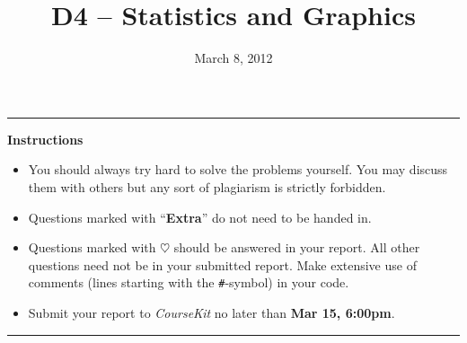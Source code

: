 \documentclass[a4paper]{article}
\title{D4 -- Statistics and Graphics}
\date{March 8, 2012}
\begin{document}
\maketitle
\hrule
\begin{center}
\textbf{Instructions}
\end{center}
\begin{itemize}
\item You should always try hard to solve the problems yourself. You may
  discuss them with others but any sort of plagiarism is strictly forbidden.

\item Questions marked with ``\textbf{Extra}'' do not need to be handed in. 

\item Questions marked with $\heartsuit$ should be answered in your report. All
  other questions need not be in your submitted report. Make extensive use of
  comments (lines starting with the \texttt{\#}-symbol) in your code.

\item Submit your report to \emph{CourseKit} no later than \textbf{Mar 15,
    6:00pm}.
\end{itemize}
\hrule
  
\end{document}
